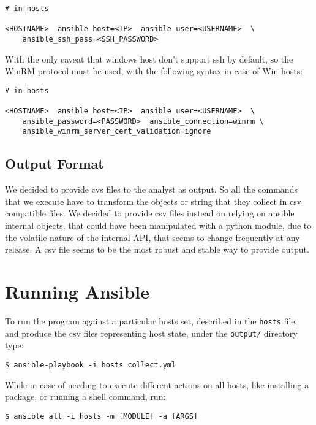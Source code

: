 \documentclass[11pt]{article}
\begin{document}
\begin{verbatim}
# in hosts

<HOSTNAME>  ansible_host=<IP>  ansible_user=<USERNAME>  \
    ansible_ssh_pass=<SSH_PASSWORD>
\end{verbatim}

With the only caveat that windows host don't support ssh by default, so the WinRM protocol must be used, with the following syntax in case of Win hosts:

\begin{verbatim}
# in hosts

<HOSTNAME>  ansible_host=<IP>  ansible_user=<USERNAME>  \
    ansible_password=<PASSWORD>  ansible_connection=winrm \
    ansible_winrm_server_cert_validation=ignore
\end{verbatim}

\subsection{Output Format}

We decided to provide cvs files to the analyst as output. So all the commands that we execute have to transform the objects or string that they collect in csv compatible files. We decided to provide csv files instead on relying on ansible internal objects, that could have been manipulated with a python module, due to the volatile nature of the internal API, that seems to change frequently at any release. A csv file seems to be the most robust and stable way to provide output.

\section{Running Ansible}

To run the program against a particular hosts set, described in the {\tt hosts} file, and produce the csv files representing host state, under the {\tt output/} directory type:

\begin{verbatim}
$ ansible-playbook -i hosts collect.yml
\end{verbatim}

While in case of needing to execute different actions on all hosts, like installing a package, or running a shell command, run:

\begin{verbatim}
$ ansible all -i hosts -m [MODULE] -a [ARGS]
\end{verbatim}
\end{document}
